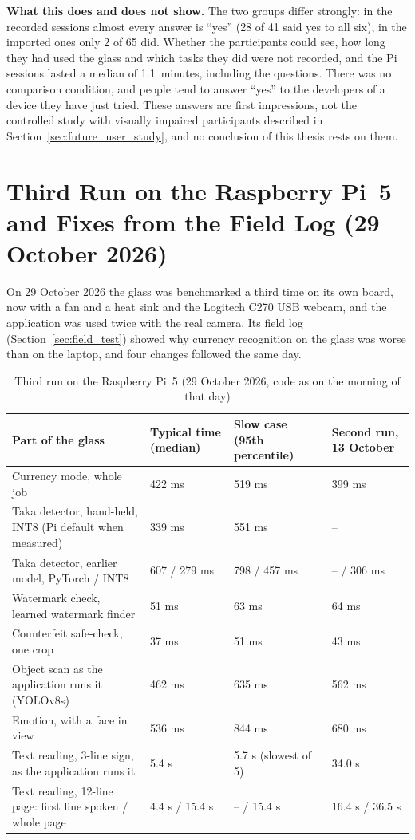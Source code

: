 \textbf{What this does and does not show.} The two groups differ strongly: in the recorded sessions almost every answer is ``yes'' (28 of 41 said yes to all six), in the imported ones only 2 of 65 did. Whether the participants could see, how long they had used the glass and which tasks they did were not recorded, and the Pi sessions lasted a median of 1.1~minutes, including the questions. There was no comparison condition, and people tend to answer ``yes'' to the developers of a device they have just tried. These answers are first impressions, not the controlled study with visually impaired participants described in Section~\ref{sec:future_user_study}, and no conclusion of this thesis rests on them.

\section{Third Run on the Raspberry Pi~5 and Fixes from the Field Log (29 October 2026)}
\label{sec:pi5_third}
On 29 October 2026 the glass was benchmarked a third time on its own board, now with a fan and a heat sink and the Logitech C270 USB webcam, and the application was used twice with the real camera. Its field log (Section~\ref{sec:field_test}) showed why currency recognition on the glass was worse than on the laptop, and four changes followed the same day.

\begin{table}[!htbp]
\centering
\caption{Third run on the Raspberry Pi~5 (29 October 2026, code as on the morning of that day)}
\label{tab:pi5_third}
\small
\begin{tabular}{|L{7.6cm}|C{2.2cm}|C{2.2cm}|C{2.1cm}|}
\hline
\textbf{Part of the glass} & \textbf{Typical time (median)} & \textbf{Slow case (95th percentile)} & \textbf{Second run, 13 October} \\ \hline
Currency mode, whole job & 422 ms & 519 ms & 399 ms \\ \hline
Taka detector, hand-held, INT8 (Pi default when measured) & 339 ms & 551 ms & -- \\ \hline
Taka detector, earlier model, PyTorch / INT8 & 607 / 279 ms & 798 / 457 ms & -- / 306 ms \\ \hline
Watermark check, learned watermark finder & 51 ms & 63 ms & 64 ms \\ \hline
Counterfeit safe-check, one crop & 37 ms & 51 ms & 43 ms \\ \hline
Object scan as the application runs it (YOLOv8s) & 462 ms & 635 ms & 562 ms \\ \hline
Emotion, with a face in view & 536 ms & 844 ms & 680 ms \\ \hline
Text reading, 3-line sign, as the application runs it & 5.4 s & 5.7 s (slowest of 5) & 34.0 s \\ \hline
Text reading, 12-line page: first line spoken / whole page & 4.4 s / 15.4 s & -- / 15.4 s & 16.4 s / 36.5 s \\ \hline
\end{tabular}
\end{table}

